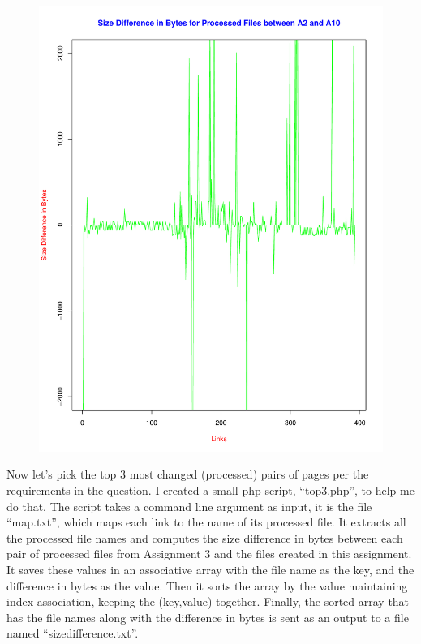 \documentclass[a4paper, 11pt]{article}
\begin{document}
\begin{figure}[H]
\centering
\includegraphics[scale=0.5]{processeddiff.pdf}
\end{figure}


Now let's pick the top 3 most changed (processed) pairs of pages per the requirements in the question. I created a small php script, ``top3.php'', to help me do that. The script takes a command line argument as input, it is the file ``map.txt'', which maps each link to the name of its processed file. It extracts all the processed file names and computes the size difference in bytes between each pair of processed files from Assignment 3 and the files created in this assignment. It saves these values in an associative array with the file name as the key, and the difference in bytes as the value. Then it sorts the array by the value maintaining index association, keeping the (key,value) together. Finally, the sorted array that has the file names along with the difference in bytes is sent as an output to a file named ``sizedifference.txt''. 
\end{document}
